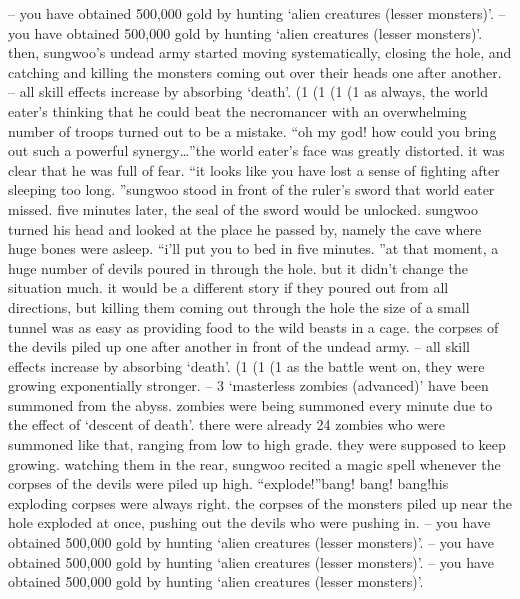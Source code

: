 – you have obtained 500,000 gold by hunting ‘alien creatures (lesser monsters)’.
– you have obtained 500,000 gold by hunting ‘alien creatures (lesser monsters)’.
then, sungwoo’s undead army started moving systematically, closing the hole, and catching and killing the monsters coming out over their heads one after another.
– all skill effects increase by absorbing ‘death’.
 (1 %
 (1 %
 (1 %
 (1 %
as always, the world eater’s thinking that he could beat the necromancer with an overwhelming number of troops turned out to be a mistake.
“oh my god! how could you bring out such a powerful synergy…”the world eater’s face was greatly distorted.
 it was clear that he was full of fear.
“it looks like you have lost a sense of fighting after sleeping too long.
”sungwoo stood in front of the ruler’s sword that world eater missed.
 five minutes later, the seal of the sword would be unlocked.
sungwoo turned his head and looked at the place he passed by, namely the cave where huge bones were asleep.
“i’ll put you to bed in five minutes.
”at that moment, a huge number of devils poured in through the hole.
but it didn’t change the situation much.
 it would be a different story if they poured out from all directions, but killing them coming out through the hole the size of a small tunnel was as easy as providing food to the wild beasts in a cage.
the corpses of the devils piled up one after another in front of the undead army.
– all skill effects increase by absorbing ‘death’.
 (1%
 (1%
 (1%
 as the battle went on, they were growing exponentially stronger.
– 3 ‘masterless zombies (advanced)’ have been summoned from the abyss.
zombies were being summoned every minute due to the effect of ‘descent of death’.
there were already 24 zombies who were summoned like that, ranging from low to high grade.
 they were supposed to keep growing.
watching them in the rear, sungwoo recited a magic spell whenever the corpses of the devils were piled up high.
“explode!”bang! bang! bang!his exploding corpses were always right.
 the corpses of the monsters piled up near the hole exploded at once, pushing out the devils who were pushing in.
– you have obtained 500,000 gold by hunting ‘alien creatures (lesser monsters)’.
– you have obtained 500,000 gold by hunting ‘alien creatures (lesser monsters)’.
– you have obtained 500,000 gold by hunting ‘alien creatures (lesser monsters)’.


